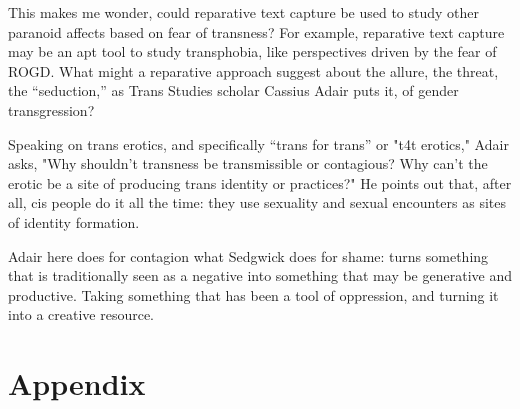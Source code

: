 \documentclass[11pt]{article}
\begin{document}
This makes me wonder, could reparative text capture be used to study
other paranoid affects based on fear of transness? For example,
reparative text capture may be an apt tool to study transphobia, like
perspectives driven by the fear of ROGD. What might a reparative
approach suggest about the allure, the threat, the “seduction,” as
Trans Studies scholar Cassius Adair puts it, of gender transgression?

Speaking on trans erotics, and specifically “trans for trans” or "t4t
erotics," Adair asks, "Why shouldn't transness be transmissible or
contagious? Why can't the erotic be a site of producing trans identity
or practices?" He points out that, after all, cis people do it all the
time: they use sexuality and sexual encounters as sites of identity
formation.

Adair here does for contagion what Sedgwick does for shame: turns
something that is traditionally seen as a negative into something that
may be generative and productive. Taking something that has been a
tool of oppression, and turning it into a creative resource.

\section{Appendix}
\label{sec:org04f1a76}
\end{document}
